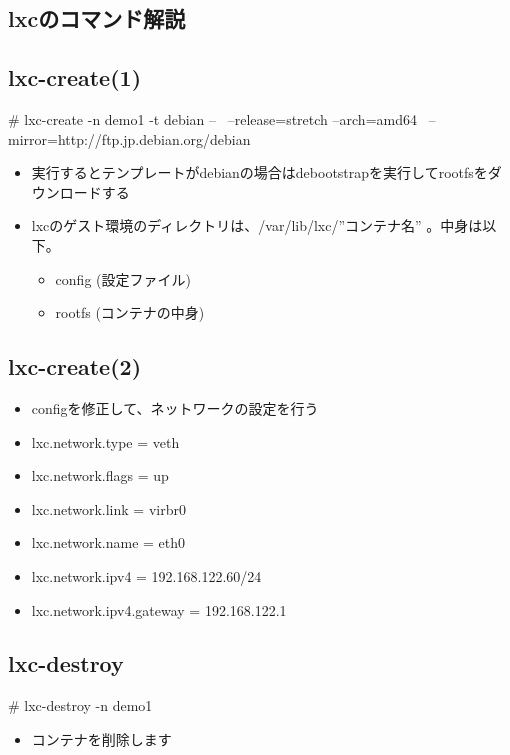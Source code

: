 \documentclass[mingoth,a4paper]{jsarticle}
\begin{document}
\subsection{lxcのコマンド解説}

\subsection[containsverbatim]{lxc-create(1)}
  \begin{commandline}
    # lxc-create -n demo1 -t debian -- \
    --release=stretch --arch=amd64 \
    --mirror=http://ftp.jp.debian.org/debian
  \end{commandline}   
  \begin{itemize}
  \item 実行するとテンプレートがdebianの場合はdebootstrapを実行してrootfsをダウンロードする
  \item lxcのゲスト環境のディレクトリは、/var/lib/lxc/''コンテナ名'' 。中身は以下。
    \begin{itemize}
    \item config (設定ファイル)
    \item rootfs (コンテナの中身)
    \end{itemize}
  \end{itemize}


\subsection[containsverbatim]{lxc-create(2)}
  \begin{itemize}
  \item configを修正して、ネットワークの設定を行う
  \item lxc.network.type = veth
  \item lxc.network.flags = up
  \item lxc.network.link = virbr0
  \item lxc.network.name = eth0
  \item lxc.network.ipv4 = 192.168.122.60/24
  \item lxc.network.ipv4.gateway = 192.168.122.1
  \end{itemize}


\subsection[containsverbatim]{lxc-destroy}
  \begin{commandline}
  # lxc-destroy -n demo1
  \end{commandline}
  \begin{itemize}
  \item コンテナを削除します
  \end{itemize}
\end{document}
